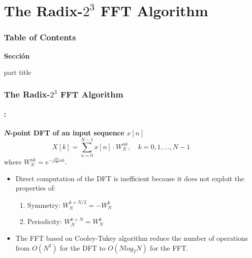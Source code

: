 \section{The Radix-$2^3$ FFT  Algorithm}
\begin{frame}
  \frametitle{\textbf{Table of Contents}}
  \begin{center}
    {\vspace{-1.5cm}\Large \textbf{Sección \thesection}\vspace{0.5cm}}
    \begin{beamercolorbox}[
      sep=8pt,center]{part title}
      \textbf{\insertsection}
    \end{beamercolorbox}
  \end{center}
\end{frame}

\begin{frame}
	\frametitle{\textbf{The Radix-$2^3$ FFT  Algorithm}}
	\framesubtitle{\secname : \subsecname}
	\begin{block}{\centering \textbf{\textit{N}-point DFT of an input sequence $x[n]$}}
		\begin{equation}
			X[k] = \sum_{n=0}^{N-1} x[n] \cdot W_N^{nk}, \quad k=0,1,...,N-1 \qquad
		\end{equation}
		where $W_N^{nk} = e^{-j\frac{2\pi}{N} nk}$. 
	\end{block}
	
	\begin{block}{\centering}
		\begin{itemize}
			\item Direct computation of the DFT is inefficient because it does not exploit the properties of:
			\begin{enumerate}
				\item Symmetry: $ W_N^{k+N/2} = -W_N^k$
				\item Periodicity:  $W_N^{k+N} = W_N^k$
			\end{enumerate}
			\item The FFT based on Cooley-Tukey algorithm reduce the number of operations from $O(N^2)$ for the DFT to $O(Nlog_2N)$ for the FFT.
		\end{itemize}	
	\end{block}
\end{frame}


